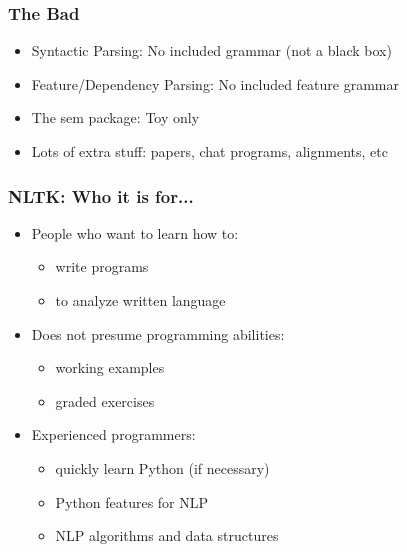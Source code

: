 \begin{frame}[fragile]\frametitle{The Bad}
  \begin{itemize}
    \item Syntactic Parsing: No included grammar (not a black box)
    \item  Feature/Dependency Parsing: No included feature grammar
    \item The sem package: Toy only 
    \item Lots of extra stuff: papers, chat programs, alignments, etc
  \end{itemize}
\end{frame}



\begin{frame}[fragile]\frametitle{NLTK: Who it is for...}
  \begin{itemize}
    \item People who want to learn how to:
    \begin{itemize}
      \item write programs
      \item to analyze written language
    \end{itemize}
    \item Does not presume programming abilities:
    \begin{itemize}
      \item working examples
      \item graded exercises
    \end{itemize}
    \item Experienced programmers:
    \begin{itemize}
      \item quickly learn Python (if necessary)
      \item Python features for NLP
      \item NLP algorithms and data structures
    \end{itemize}
  \end{itemize}
\end{frame}

